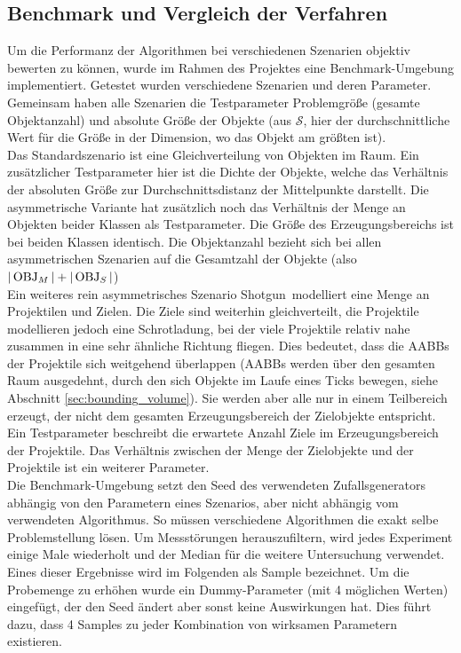 \subsection{Benchmark und Vergleich der Verfahren}
\label{sec:benchmark}
Um die Performanz der Algorithmen bei verschiedenen Szenarien objektiv bewerten zu können, wurde im Rahmen des Projektes eine Benchmark-Umgebung implementiert. Getestet wurden verschiedene Szenarien und deren Parameter. Gemeinsam haben alle Szenarien die Testparameter Problemgröße (gesamte Objektanzahl) und absolute Größe der Objekte (aus $\mathcal{S}$, hier der durchschnittliche Wert für die Größe in der Dimension, wo das Objekt am größten ist).\\
Das Standardszenario ist eine Gleichverteilung von Objekten im Raum. 
Ein zusätzlicher Testparameter hier ist die Dichte der Objekte, welche das Verhältnis der absoluten Größe zur Durchschnittsdistanz der Mittelpunkte darstellt. Die asymmetrische Variante hat zusätzlich noch das Verhältnis der Menge an Objekten beider Klassen als Testparameter. Die Größe des Erzeugungsbereichs ist bei beiden Klassen identisch. Die Objektanzahl bezieht sich bei allen asymmetrischen Szenarien auf die Gesamtzahl der Objekte (also $|\operatorname{OBJ}_M| + |\operatorname{OBJ}_S|$)\\
Ein weiteres rein asymmetrisches Szenario \glqq Shotgun\grqq ~modelliert eine Menge an Projektilen und Zielen. Die Ziele sind weiterhin gleichverteilt, die Projektile modellieren jedoch eine Schrotladung, bei der viele Projektile relativ nahe zusammen in eine sehr ähnliche Richtung fliegen. Dies bedeutet, dass die AABBs der Projektile sich weitgehend überlappen (AABBs werden über den gesamten Raum ausgedehnt, durch den sich Objekte im Laufe eines Ticks bewegen, siehe Abschnitt \ref{sec:bounding_volume}). Sie werden aber alle nur in einem Teilbereich erzeugt, der nicht dem gesamten Erzeugungsbereich der Zielobjekte entspricht. Ein Testparameter beschreibt die erwartete Anzahl Ziele im Erzeugungsbereich der Projektile. Das Verhältnis zwischen der Menge der Zielobjekte und der Projektile ist ein weiterer Parameter.\\
Die Benchmark-Umgebung setzt den Seed des verwendeten Zufallsgenerators abhängig von den Parametern eines Szenarios, aber nicht abhängig vom verwendeten Algorithmus. So müssen verschiedene Algorithmen die exakt selbe Problemstellung lösen. Um Messstörungen herauszufiltern, wird jedes Experiment einige Male wiederholt und der Median für die weitere Untersuchung verwendet. Eines dieser Ergebnisse wird im Folgenden als Sample bezeichnet. Um die Probemenge zu erhöhen wurde ein Dummy-Parameter (mit 4 möglichen Werten) eingefügt, der den Seed ändert aber sonst keine Auswirkungen hat. Dies führt dazu, dass 4 Samples zu jeder Kombination von wirksamen Parametern existieren.\\
